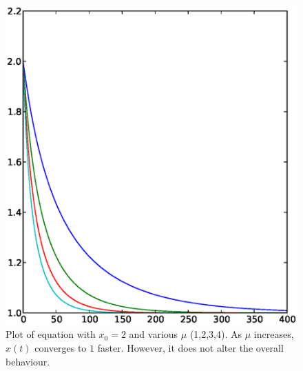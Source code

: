\documentclass[11pt]{article}
\begin{document}
\begin{figure}[h]
  \begin{center}
    \includegraphics[scale=0.5]{logistic_diffeq_mu1234_x2.eps}
  \end{center}
  \caption{
    Plot of equation  with $x_0 = 2$ and various $\mu$ (1,2,3,4).
    As $\mu$ increases, $x(t)$ converges to $1$ faster.
    However, it does not alter the overall behaviour.
  }
  \label{fig:logistic_diffeq2}
\end{figure}
\end{document}
